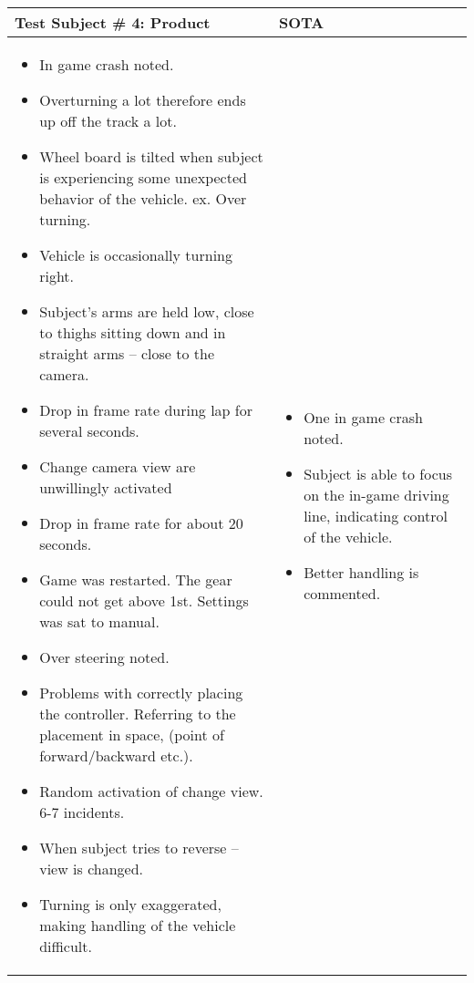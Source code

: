 \begin{table}[!htbp]
\centering
\begin{tabular}{| p{3.4in} | p{2in} |}
\hline
	\textbf{Test Subject \# 4: Product} & \textbf{SOTA}\\
\hline
	\begin{itemize}
		\item In game crash noted.
		\item Overturning a lot therefore ends up off the track a lot.
		\item Wheel board is tilted when subject is experiencing some unexpected behavior of the vehicle. ex. Over turning.
		\item Vehicle is occasionally turning right.
		\item Subject’s arms are held low, close to thighs sitting down and in straight arms – close to the camera.
		\item Drop in frame rate during lap for several seconds.
		\item Change camera view are unwillingly activated
		\item Drop in frame rate for about 20 seconds.
		\item Game was restarted. The gear could not get above 1st. Settings was sat to manual.
		\item Over steering noted.
		\item Problems with correctly placing the controller. Referring to the placement in space, (point of forward/backward etc.).
		\item Random activation of change view. 6-7 incidents.
		\item When subject tries to reverse – view is changed.
		\item Turning is only exaggerated, making handling of the vehicle difficult.
	\end{itemize}
	&
	\begin{itemize}
		\item One in game crash noted.
		\item Subject is able to focus on the in-game driving line, indicating control of the vehicle.
		\item Better handling is commented.
	\end{itemize}
	\\
\hline
\end{tabular}
\end{table}


